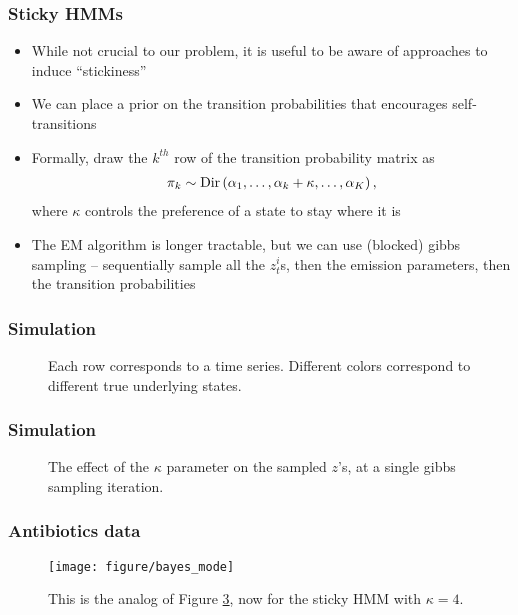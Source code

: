 \documentclass{beamer}
\begin{document}
\begin{frame}
  \frametitle{Sticky HMMs}
\begin{itemize}
\item While not crucial to our problem, it is useful to be aware of approaches
  to induce ``stickiness''
\item We can place a prior on the transition probabilities that encourages
  self-transitions
  \item Formally, draw the $k^{th}$ row of the transition probability matrix as
\begin{align*}
  \pi_{k} \sim \textnormal{Dir}\left(\alpha_{1}, \dots, \alpha_{k} + \kappa, \dots, \alpha_{K}\right),
\end{align*}
where $\kappa$ controls the preference of a state to stay where it is
\item The EM algorithm is longer tractable, but we can use (blocked) gibbs
  sampling -- sequentially sample all the $z_{t}^{i}$s, then the emission
  parameters, then the transition probabilities
\end{itemize}
\end{frame}

\begin{frame}
  \frametitle{Simulation}
  \begin{figure}
    \centering
    \qquad
    \caption{Each row corresponds to a time series. Different colors correspond
      to different true underlying states.}
    \label{fig:sticky_hmm_kappas}
  \end{figure}

\end{frame}

\begin{frame}
  \frametitle{Simulation}
  \begin{figure}
    \centering
    \qquad
    \caption{The effect of the $\kappa$ parameter on the sampled $z$'s, at a
      single gibbs sampling iteration.}
    \label{fig:sticky_hmm_kappas}
  \end{figure}
\end{frame}

\begin{frame}
  \frametitle{Antibiotics data}
  \begin{figure}[ht]
  \centering
  \texttt{[image: figure/bayes\_mode]}
  \caption{This is the analog of Figure \ref{fig:hmm_mode}, now for the sticky
    HMM with $\kappa = 4$. \label{fig:hmm_mode} }
\end{figure}
\end{frame}
\end{document}
